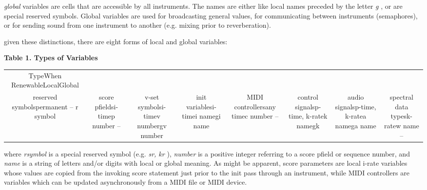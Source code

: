  \emph{global}
 variables are cells that are accessible by all instruments. The names are either like local names preceded by the letter \emph{g}
, or are special reserved symbols. Global variables are used for broadcasting general values, for communicating between instruments (semaphores), or for sending sound from one instrument to another (e.g. mixing prior to reverberation). 


  given these distinctions, there are eight forms of local and global variables: 


 


 \textbf{Table 1. Types of Variables}



\begin{tabular}{|c|c|c|c|c|c|c|c|}
TypeWhen RenewableLocalGlobal & & & & & & & \\
reserved symbolspermanent -- r symbol &score pfieldsi-timep number --  &v-set symbolsi-timev numbergv number &init variablesi-timei namegi name  &MIDI controllersany timec number --  &control signalsp-time, k-ratek namegk &audio signalsp-time, k-ratea namega name &spectral data typesk-ratew name --  \\

\end{tabular}



  where \emph{rsymbol}
 is a special reserved symbol (e.g. \emph{sr, kr}
), \emph{number}
 is a positive integer referring to a score pfield or sequence number, and \emph{name}
 is a string of letters and/or digits with local or global meaning. As might be apparent, score parameters are local i-rate variables whose values are copied from the invoking score statement just prior to the init pass through an instrument, while MIDI controllers are variables which can be updated asynchronously from a MIDI file or MIDI device. 


\begin{comment}
\begin{tabular}{lcr}
Previous &Home &Next \\
Orchestra Statement Types &Up &Expressions

\end{tabular}



\end{comment}
